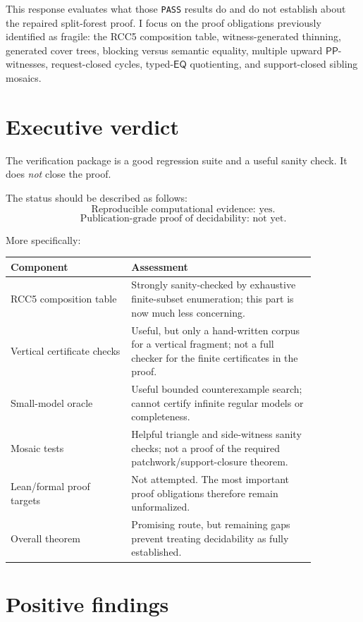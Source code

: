 \documentclass[11pt]{article}
\newcommand{\PP}{\mathsf{PP}}
\newcommand{\EQ}{\mathsf{EQ}}
\begin{document}
This response evaluates what those \texttt{PASS} results do and do not establish about the repaired split-forest proof.  I focus on the proof obligations previously identified as fragile: the RCC5 composition table, witness-generated thinning, generated cover trees, blocking versus semantic equality, multiple upward \(\PP\)-witnesses, request-closed cycles, typed-\(\EQ\) quotienting, and support-closed sibling mosaics.

\section{Executive verdict}

The verification package is a good regression suite and a useful sanity check.  It does \emph{not} close the proof.

The status should be described as follows:
\[
\boxed{\text{Reproducible computational evidence: yes.}}
\]
\[
\boxed{\text{Publication-grade proof of decidability: not yet.}}
\]

More specifically:

\begin{center}
\begin{tabular}{p{0.34\linewidth}p{0.52\linewidth}}
\toprule
Component & Assessment \\
\midrule
RCC5 composition table & Strongly sanity-checked by exhaustive finite-subset enumeration; this part is now much less concerning. \\
Vertical certificate checks & Useful, but only a hand-written corpus for a vertical fragment; not a full checker for the finite certificates in the proof. \\
Small-model oracle & Useful bounded counterexample search; cannot certify infinite regular models or completeness. \\
Mosaic tests & Helpful triangle and side-witness sanity checks; not a proof of the required patchwork/support-closure theorem. \\
Lean/formal proof targets & Not attempted.  The most important proof obligations therefore remain unformalized. \\
Overall theorem & Promising route, but remaining gaps prevent treating decidability as fully established. \\
\bottomrule
\end{tabular}
\end{center}

\section{Positive findings}
\end{document}
